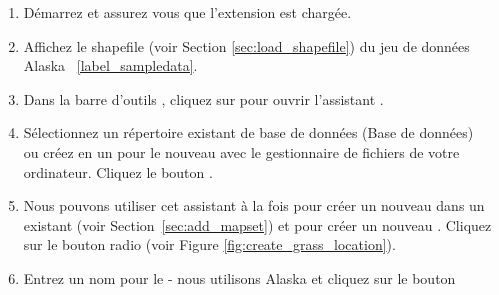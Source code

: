 \begin{enumerate}
  \item Démarrez \qg et assurez vous que l'extension \grass est chargée.
  \item Affichez le shapefile  (voir Section \ref{sec:load_shapefile}) du jeu de données \qg Alaska ~\ref{label_sampledata}.
  \item Dans la barre d'outils \grass, cliquez sur  pour ouvrir l'assistant .
  \item Sélectionnez un répertoire existant de base de données \grass (Base de données)\\  ou créez en un pour le nouveau  avec le gestionnaire de fichiers de votre ordinateur. Cliquez le bouton .  
  \item Nous pouvons utiliser cet assistant à la fois pour créer un nouveau  dans un  existant (voir Section~\ref{sec:add_mapset}) et pour créer un nouveau . Cliquez sur le bouton radio  (voir Figure \ref{fig:create_grass_location}).
  \item Entrez un nom pour le  - nous utilisons Alaska et cliquez sur le bouton 

\end{enumerate}
